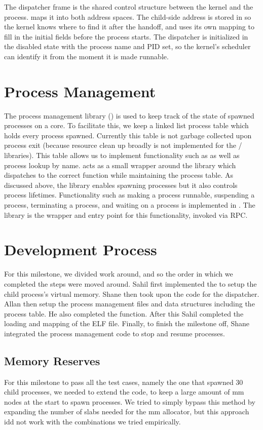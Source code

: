 The dispatcher frame is the shared control structure between the kernel and the
process.  maps it into both address spaces. The child-side address is stored
in  so the kernel knows where to find it after the handoff, and
 uses its own mapping to fill in the initial fields before the process starts.
The dispatcher is initialized in the disabled state with the process name and PID
set, so the kernel's scheduler can identify it from the moment it is made
runnable.

\section{Process Management}
The process management library () is used to keep track of the state of spawned
processes on a core. To facilitate this, we keep a linked list process table which holds every process
spawned. Currently this table is not garbage collected upon process exit (because resource clean up broadly
is not implemented for the / libraries). This table allows us to implement functionality
such as  as well as process lookup by name.  acts as a small wrapper around
the  library which dispatches to the correct function while maintaining the process table. As discussed above,
the  library enables spawning processes but it also controls process lifetimes. Functionality such
as making a process runnable, suspending a process, terminating a process, and waiting on a process is implemented in . The 
library is the wrapper and entry point for this functionality, invoked via RPC.

\section{Development Process}
For this milestone, we divided work around, and so the order in which we completed 
the steps were moved around. Sahil first implemented the  
to setup the child process's virtual memory. Shane then took upon the code for the
dispatcher. Allan then setup the process management files and data structures including
the process table. He also completed the  function. After this
Sahil completed the loading and mapping of the ELF file. Finally, to finish the milestone
off, Shane integrated the process management code to stop and resume processes.

\subsection{Memory Reserves}
For this milestone to pass all the test cases, namely the one that spawned 30 child processes,
we needed to extend the  code, to keep a large amount of mm nodes at the start
to spawn processes. We tried to simply bypass this method by expanding the number of slabs needed
for the mm allocator, but this approach idd not work with the combinations we tried empirically.

